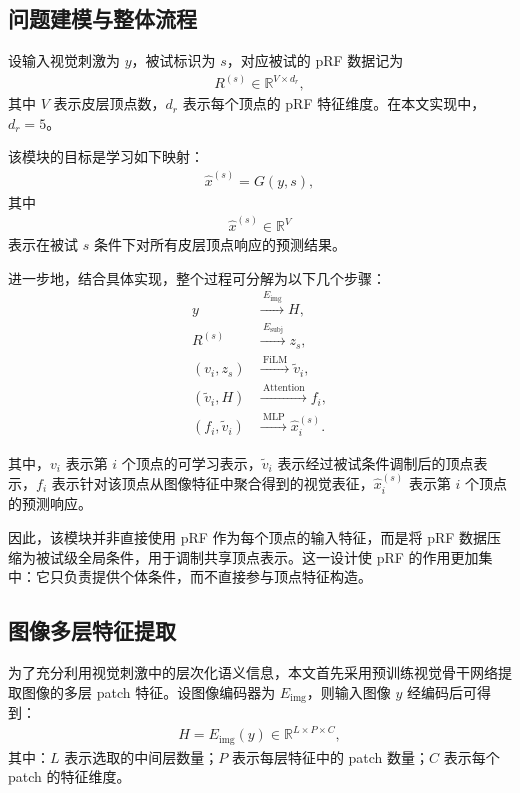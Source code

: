 \subsection{问题建模与整体流程}

设输入视觉刺激为 $y$，被试标识为 $s$，对应被试的 pRF 数据记为
\begin{align}
  R^{(s)} \in \mathbb{R}^{V \times d_r},
\end{align}
其中 $V$ 表示皮层顶点数，$d_r$ 表示每个顶点的 pRF 特征维度。在本文实现中，$d_r=5$。

该模块的目标是学习如下映射：
\begin{align}
  \hat{x}^{(s)} = G(y,s),
\end{align}
其中
\begin{align}
  \hat{x}^{(s)} \in \mathbb{R}^{V}
\end{align}
表示在被试 $s$ 条件下对所有皮层顶点响应的预测结果。

进一步地，结合具体实现，整个过程可分解为以下几个步骤：
\begin{align}
  y &\xrightarrow{\ E_{\mathrm{img}}\ } H, \\
  R^{(s)} &\xrightarrow{\ E_{\mathrm{subj}}\ } z_s, \\
  (v_i, z_s) &\xrightarrow{\ \mathrm{FiLM}\ } \tilde{v}_i, \\
  (\tilde{v}_i, H) &\xrightarrow{\ \mathrm{Attention}\ } f_i, \\
  (f_i, \tilde{v}_i) &\xrightarrow{\ \mathrm{MLP}\ } \hat{x}_i^{(s)}.
\end{align}

其中，$v_i$ 表示第 $i$ 个顶点的可学习表示，$\tilde{v}_i$ 表示经过被试条件调制后的顶点表示，$f_i$ 表示针对该顶点从图像特征中聚合得到的视觉表征，$\hat{x}_i^{(s)}$ 表示第 $i$ 个顶点的预测响应。

因此，该模块并非直接使用 pRF 作为每个顶点的输入特征，而是将 pRF 数据压缩为被试级全局条件，用于调制共享顶点表示。这一设计使 pRF 的作用更加集中：它只负责提供个体条件，而不直接参与顶点特征构造。

\subsection{图像多层特征提取}

为了充分利用视觉刺激中的层次化语义信息，本文首先采用预训练视觉骨干网络提取图像的多层 patch 特征。设图像编码器为 $E_{\mathrm{img}}$，则输入图像 $y$ 经编码后可得到：
\begin{align}
  H = E_{\mathrm{img}}(y) \in \mathbb{R}^{L \times P \times C},
\end{align}
其中：$L$ 表示选取的中间层数量；$P$ 表示每层特征中的 patch 数量；$C$ 表示每个 patch 的特征维度。

